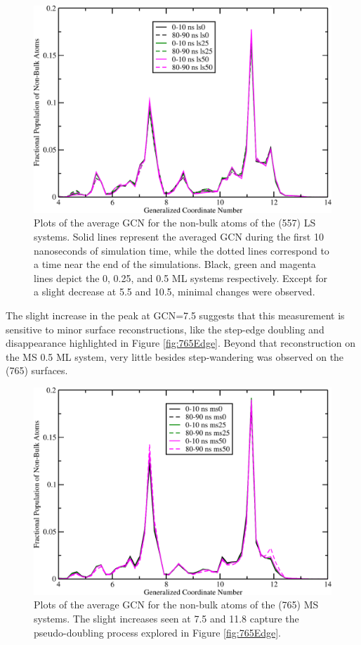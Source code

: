 \begin{figure}
\centering
\includegraphics[width=0.9\linewidth]{../figures/appB/557ls_GCNF.pdf}
\caption{Plots of the average GCN for the non-bulk atoms of the  (557)
LS systems. Solid lines represent the averaged GCN during the first 10
nanoseconds of simulation time, while the dotted lines correspond to a time
near the end of the simulations. Black, green and magenta lines depict the 0,
0.25, and 0.5 ML systems respectively. Except for a slight decrease at 5.5 and
10.5, minimal changes were observed.}
\label{fig:557lsGCN}
\end{figure}
\newpage


The slight increase in the peak at GCN=7.5 suggests that this measurement is
sensitive to minor surface reconstructions, like the step-edge doubling and
disappearance highlighted in Figure \ref{fig:765Edge}. Beyond that
reconstruction on the MS 0.5 ML system, very little besides step-wandering was
observed on the (765) surfaces.

\begin{figure}
\centering
\includegraphics[width=0.9\linewidth]{../figures/appB/765ms_GCNF.pdf}
\caption{Plots of the average GCN for the non-bulk atoms of the  (765)
MS systems. The slight increases seen at 7.5 and 11.8 capture the
pseudo-doubling process explored in Figure \ref{fig:765Edge}.}
\label{fig:765msGCN}
\end{figure}
\newpage

